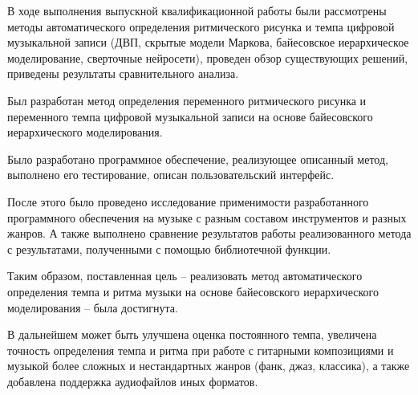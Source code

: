 
В ходе выполнения выпускной квалификационной работы были рассмотрены методы автоматического определения ритмического рисунка и темпа цифровой музыкальной записи (ДВП, скрытые модели Маркова, байесовское иерархическое моделирование, сверточные нейросети), проведен обзор существующих решений, приведены результаты сравнительного анализа.

Был разработан метод определения переменного ритмического рисунка и переменного темпа цифровой музыкальной записи на основе байесовского иерархического моделирования.

Было разработано программное обеспечение, реализующее описанный метод, выполнено его тестирование, описан пользовательский интерфейс.

После этого было проведено исследование применимости разработанного программного обеспечения на музыке с разным составом инструментов и разных жанров. А также выполнено сравнение результатов работы реализованного метода с результатами, полученными с помощью библиотечной функции.

Таким образом, поставленная цель -- реализовать метод автоматического определения темпа и ритма музыки на основе байесовского иерархического моделирования -- была достигнута.

В дальнейшем может быть улучшена оценка постоянного темпа, увеличена точность определения темпа и ритма при работе с гитарными композициями и музыкой более сложных и нестандартных жанров (фанк, джаз, классика), а также добавлена поддержка аудиофайлов иных форматов.